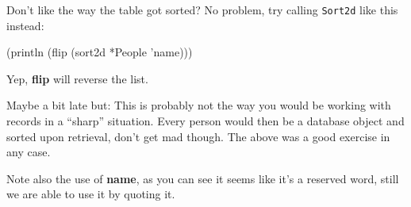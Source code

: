 Don't like the way the table got sorted? No problem, try calling
\texttt{Sort2d} like this instead:


\begin{wideverbatim}
(println (flip (sort2d *People 'name)))
\end{wideverbatim}

Yep, \textbf{flip} will reverse the list.

Maybe a bit late but: This is probably not the way you would be working
with records in a ``sharp'' situation. Every person would then be a
database object and sorted upon retrieval, don't get mad though. The
above was a good exercise in any case.

Note also the use of \textbf{name}, as you can see it seems like it's a
reserved word, still we are able to use it by quoting it.

